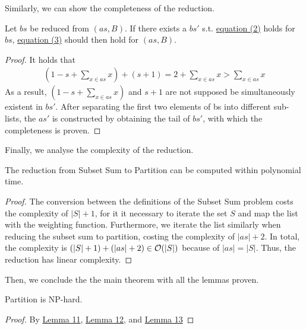 Similarly, we can show the completeness of the reduction.
\begin{lemma}[Completeness]
    \label{lemma:12}
    Let $bs$ be reduced from $(as, B)$. If there exists a $bs'$ s.t. \hyperref[eq:2]{equation (2)} holds for $bs$, 
    \hyperref[eq:3]{equation (3)} should then hold for $(as, B)$.
\end{lemma}
\begin{proof}
    It holds that
\begin{align*}
    (1 - s + \sum_{x \in as} x) + (s + 1) = 2 + \sum_{x \in as} x > \sum_{x \in as} x
\end{align*}
As a result, $(1 - s + \sum_{x \in as} x)$ and $s + 1$ are not supposed be simultaneously existent in $bs'$. 
After separating the first two elements of bs into different sub-lists, the $as'$ is constructed 
by obtaining the tail of $bs'$, with which the completeness is proven.
\end{proof} 
Finally, we analyse the complexity of the reduction.
\begin{lemma}
    \label{lemma:13}
    The reduction from Subset Sum to Partition can be computed within polynomial time.
\end{lemma}
\begin{proof}
The conversion between the definitions of the Subset Sum problem costs the complexity of $|S| + 1$,
for it it necessary to iterate the set $S$ and map the list with the weighting function. Furthermore, we iterate the list similarly when reducing the subset sum to partition, costing
the complexity of $|as| + 2$. In total, the complexity is $(|S| + 1) + (|as| + 2) \in \mathcal{O}({|S|})$  because of $|as| = |S|$.
Thus, the reduction has linear complexity.
\end{proof}
Then, we conclude the the main theorem with all the lemmas proven.
\begin{theorem}
    Partition is NP-hard.
\end{theorem}
\begin{proof}
    By \hyperref[lemma:11]{Lemma 11}, \hyperref[lemma:12]{Lemma 12}, and \hyperref[lemma:13]{Lemma 13}
\end{proof}
